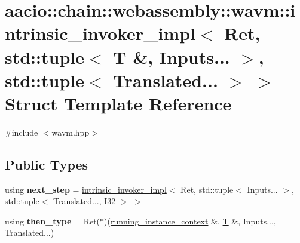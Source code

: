 \hypertarget{structaacio_1_1chain_1_1webassembly_1_1wavm_1_1intrinsic__invoker__impl_3_01_ret_00_01std_1_1tupfa2034b22b99cd06aa81fc0ac2ffb564}{}\section{aacio\+:\+:chain\+:\+:webassembly\+:\+:wavm\+:\+:intrinsic\+\_\+invoker\+\_\+impl$<$ Ret, std\+:\+:tuple$<$ T \&, Inputs... $>$, std\+:\+:tuple$<$ Translated... $>$ $>$ Struct Template Reference}
\label{structaacio_1_1chain_1_1webassembly_1_1wavm_1_1intrinsic__invoker__impl_3_01_ret_00_01std_1_1tupfa2034b22b99cd06aa81fc0ac2ffb564}


{\ttfamily \#include $<$wavm.\+hpp$>$}

\subsection*{Public Types}
\begin{DoxyCompactItemize}
\item 
\mbox{\label{structaacio_1_1chain_1_1webassembly_1_1wavm_1_1intrinsic__invoker__impl_3_01_ret_00_01std_1_1tupfa2034b22b99cd06aa81fc0ac2ffb564_a7c287fe599cf37058b2eed4a778e1590}} 
using {\bfseries next\+\_\+step} = \mbox{\hyperlink{structaacio_1_1chain_1_1webassembly_1_1wavm_1_1intrinsic__invoker__impl}{intrinsic\+\_\+invoker\+\_\+impl}}$<$ Ret, std\+::tuple$<$ Inputs... $>$, std\+::tuple$<$ Translated..., I32 $>$ $>$
\item 
\mbox{\label{structaacio_1_1chain_1_1webassembly_1_1wavm_1_1intrinsic__invoker__impl_3_01_ret_00_01std_1_1tupfa2034b22b99cd06aa81fc0ac2ffb564_ab61c00796d1487b3896cd0454feea4f9}} 
using {\bfseries then\+\_\+type} = Ret($\ast$)(\mbox{\hyperlink{structaacio_1_1chain_1_1webassembly_1_1wavm_1_1running__instance__context}{running\+\_\+instance\+\_\+context}} \&, \mbox{\hyperlink{struct_t}{T}} \&, Inputs..., Translated...)
\end{DoxyCompactItemize}
